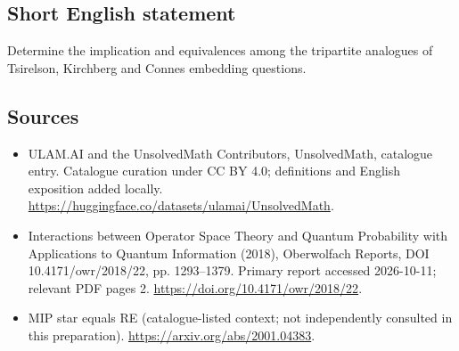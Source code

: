 \documentclass[11pt]{article}
\begin{document}
\subsection{Short English statement}
Determine the implication and equivalences among the tripartite analogues of Tsirelson, Kirchberg and Connes embedding questions.
\subsection{Sources}
\begin{itemize}
\item[\hypertarget{source:statement:1}{S1}] ULAM.AI and the UnsolvedMath Contributors, UnsolvedMath, catalogue entry. Catalogue curation under CC BY 4.0; definitions and English exposition added locally.
\url{https://huggingface.co/datasets/ulamai/UnsolvedMath}.
\item[\hypertarget{source:statement:2}{S2}] Interactions between Operator Space Theory and Quantum Probability with Applications to Quantum Information (2018), Oberwolfach Reports, DOI 10.4171/owr/2018/22, pp. 1293--1379. Primary report accessed 2026-10-11; relevant PDF pages 2.
\url{https://doi.org/10.4171/owr/2018/22}.
\item[\hypertarget{source:statement:3}{S3}] MIP star equals RE (catalogue-listed context; not independently consulted in this preparation).
\url{https://arxiv.org/abs/2001.04383}.
\end{itemize}
\label{end:statement}
\end{document}
